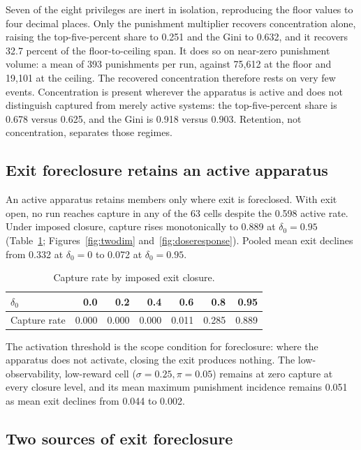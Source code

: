 \documentclass[12pt]{article}
\begin{document}
Seven of the eight privileges are inert in isolation, reproducing the floor values to four decimal places. Only the punishment multiplier recovers concentration alone, raising the top-five-percent share to 0.251 and the Gini to 0.632, and it recovers 32.7 percent of the floor-to-ceiling span. It does so on near-zero punishment volume: a mean of 393 punishments per run, against 75,612 at the floor and 19,101 at the ceiling. The recovered concentration therefore rests on very few events. Concentration is present wherever the apparatus is active and does not distinguish captured from merely active systems: the top-five-percent share is 0.678 versus 0.625, and the Gini is 0.918 versus 0.903. Retention, not concentration, separates those regimes.

\subsection{Exit foreclosure retains an active apparatus}

An active apparatus retains members only where exit is foreclosed. With exit open, no run reaches capture in any of the 63 cells despite the 0.598 active rate. Under imposed closure, capture rises monotonically to 0.889 at \(\delta_0=0.95\) (Table~\ref{tab:dose-response}; Figures~\ref{fig:twodim} and~\ref{fig:doseresponse}). Pooled mean exit declines from 0.332 at \(\delta_0=0\) to 0.072 at \(\delta_0=0.95\).

\begin{table}[htbp]
\centering
\caption{Capture rate by imposed exit closure.}
\label{tab:dose-response}
\begin{tabular}{lrrrrrr}
\hline
$\delta_0$ & 0.0 & 0.2 & 0.4 & 0.6 & 0.8 & 0.95 \\
\hline
Capture rate & 0.000 & 0.000 & 0.000 & 0.011 & 0.285 & 0.889 \\
\hline
\end{tabular}
\end{table}

The activation threshold is the scope condition for foreclosure: where the apparatus does not activate, closing the exit produces nothing. The low-observability, low-reward cell (\(\sigma=0.25,\pi=0.05\)) remains at zero capture at every closure level, and its mean maximum punishment incidence remains 0.051 as mean exit declines from 0.044 to 0.002.

\subsection{Two sources of exit foreclosure}
\end{document}
